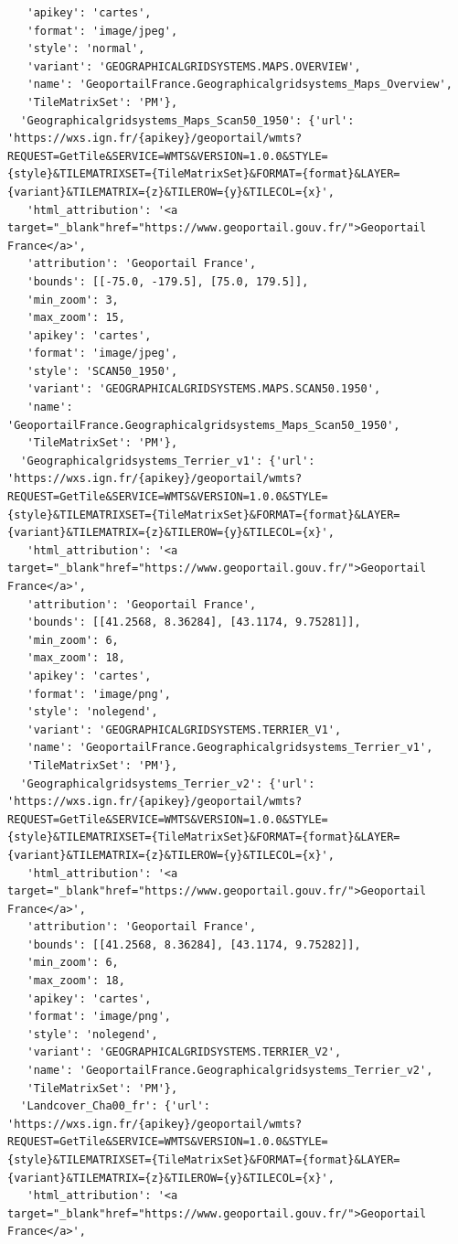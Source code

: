 \documentclass[
  letterpaper,
  DIV=11,
  numbers=noendperiod]{scrreprt}
\begin{document}
\begin{verbatim}
   'apikey': 'cartes',
   'format': 'image/jpeg',
   'style': 'normal',
   'variant': 'GEOGRAPHICALGRIDSYSTEMS.MAPS.OVERVIEW',
   'name': 'GeoportailFrance.Geographicalgridsystems_Maps_Overview',
   'TileMatrixSet': 'PM'},
  'Geographicalgridsystems_Maps_Scan50_1950': {'url': 'https://wxs.ign.fr/{apikey}/geoportail/wmts?REQUEST=GetTile&SERVICE=WMTS&VERSION=1.0.0&STYLE={style}&TILEMATRIXSET={TileMatrixSet}&FORMAT={format}&LAYER={variant}&TILEMATRIX={z}&TILEROW={y}&TILECOL={x}',
   'html_attribution': '<a target="_blank"href="https://www.geoportail.gouv.fr/">Geoportail France</a>',
   'attribution': 'Geoportail France',
   'bounds': [[-75.0, -179.5], [75.0, 179.5]],
   'min_zoom': 3,
   'max_zoom': 15,
   'apikey': 'cartes',
   'format': 'image/jpeg',
   'style': 'SCAN50_1950',
   'variant': 'GEOGRAPHICALGRIDSYSTEMS.MAPS.SCAN50.1950',
   'name': 'GeoportailFrance.Geographicalgridsystems_Maps_Scan50_1950',
   'TileMatrixSet': 'PM'},
  'Geographicalgridsystems_Terrier_v1': {'url': 'https://wxs.ign.fr/{apikey}/geoportail/wmts?REQUEST=GetTile&SERVICE=WMTS&VERSION=1.0.0&STYLE={style}&TILEMATRIXSET={TileMatrixSet}&FORMAT={format}&LAYER={variant}&TILEMATRIX={z}&TILEROW={y}&TILECOL={x}',
   'html_attribution': '<a target="_blank"href="https://www.geoportail.gouv.fr/">Geoportail France</a>',
   'attribution': 'Geoportail France',
   'bounds': [[41.2568, 8.36284], [43.1174, 9.75281]],
   'min_zoom': 6,
   'max_zoom': 18,
   'apikey': 'cartes',
   'format': 'image/png',
   'style': 'nolegend',
   'variant': 'GEOGRAPHICALGRIDSYSTEMS.TERRIER_V1',
   'name': 'GeoportailFrance.Geographicalgridsystems_Terrier_v1',
   'TileMatrixSet': 'PM'},
  'Geographicalgridsystems_Terrier_v2': {'url': 'https://wxs.ign.fr/{apikey}/geoportail/wmts?REQUEST=GetTile&SERVICE=WMTS&VERSION=1.0.0&STYLE={style}&TILEMATRIXSET={TileMatrixSet}&FORMAT={format}&LAYER={variant}&TILEMATRIX={z}&TILEROW={y}&TILECOL={x}',
   'html_attribution': '<a target="_blank"href="https://www.geoportail.gouv.fr/">Geoportail France</a>',
   'attribution': 'Geoportail France',
   'bounds': [[41.2568, 8.36284], [43.1174, 9.75282]],
   'min_zoom': 6,
   'max_zoom': 18,
   'apikey': 'cartes',
   'format': 'image/png',
   'style': 'nolegend',
   'variant': 'GEOGRAPHICALGRIDSYSTEMS.TERRIER_V2',
   'name': 'GeoportailFrance.Geographicalgridsystems_Terrier_v2',
   'TileMatrixSet': 'PM'},
  'Landcover_Cha00_fr': {'url': 'https://wxs.ign.fr/{apikey}/geoportail/wmts?REQUEST=GetTile&SERVICE=WMTS&VERSION=1.0.0&STYLE={style}&TILEMATRIXSET={TileMatrixSet}&FORMAT={format}&LAYER={variant}&TILEMATRIX={z}&TILEROW={y}&TILECOL={x}',
   'html_attribution': '<a target="_blank"href="https://www.geoportail.gouv.fr/">Geoportail France</a>',

\end{verbatim}
\end{document}
